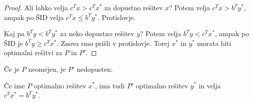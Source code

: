 \documentclass[11pt, a4paper]{article}
\begin{document}
    \begin{proof}
        Ali lahko velja \(c^Tx > c^Tx^*\) za dopustno rešitev \(x\)?
        Potem velja \(c^Tx > b^Ty^*\), ampak po ŠID velja \(c^Tx \le b^Ty^*\). Protislovje.
        \par
        Kaj pa \(b^Ty < b^Ty^*\) za neko dopustno rešitev \(y\)?
        Potem velja \(b^Ty < c^Tx^*\), ampak po ŠID je \(b^Ty \ge c^Tx^*\). Znova smo prišli v protislovje. Torej \(x^*\) in \(y^*\) morata biti optimalni rešitvi za \(P\) in \(P'\).
    \end{proof}

    \begin{corollary}
        Če je \(P\) neomejen, je \(P'\) nedopusten.
    \end{corollary}

    \begin{theorem}
        Če ime \(P\) optimalno rešitev \(x^*\), ima tudi \(P'\) optimalno rešitev \(y^*\) in velja \(c^Tx^* = b^Ty^*\).
    \end{theorem}
\end{document}
